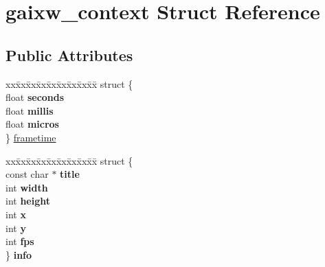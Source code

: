 \hypertarget{structgaixw__context}{}\section{gaixw\+\_\+context Struct Reference}
\label{structgaixw__context}
\subsection*{Public Attributes}
\begin{DoxyCompactItemize}
\item 
\begin{tabbing}
xx\=xx\=xx\=xx\=xx\=xx\=xx\=xx\=xx\=\kill
struct \{\\
float {\bfseries seconds}\\
float {\bfseries millis}\\
float {\bfseries micros}\\
\} \hyperlink{structgaixw__context_a63f66515f64f3870e4530f99f8627455}{frametime}\\

\end{tabbing}\item 
\mbox{\label{structgaixw__context_ad08fec1e1f27bbf1b230ca3b2af55fbf}} 
\begin{tabbing}
xx\=xx\=xx\=xx\=xx\=xx\=xx\=xx\=xx\=\kill
struct \{\\
const char $\ast$ {\bfseries title}\\
int {\bfseries width}\\
int {\bfseries height}\\
int {\bfseries x}\\
int {\bfseries y}\\
int {\bfseries fps}\\
\} {\bfseries info}\\


\end{tabbing}
\end{DoxyCompactItemize}
